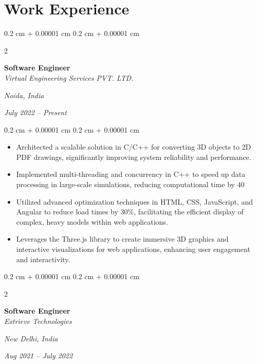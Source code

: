 \documentclass[10pt, letterpaper]{article}
\newenvironment{highlights}{
    \begin{itemize}[
        topsep=0.10 cm,
        parsep=0.10 cm,
        partopsep=0pt,
        itemsep=0pt,
        leftmargin=0.4 cm + 10pt
    ]
}{
    \end{itemize}
} %
\newenvironment{onecolentry}{
    \begin{adjustwidth}{
        0.2 cm + 0.00001 cm
    }{
        0.2 cm + 0.00001 cm
    }
}{
    \end{adjustwidth}
} %
\newenvironment{twocolentry}[2][]{
    \onecolentry
    \def\secondColumn{#2}
    \setcolumnwidth{\fill, 4.5 cm}
    \begin{paracol}{2}
}{
    \switchcolumn \raggedleft \secondColumn
    \end{paracol}
    \endonecolentry
} %
\begin{document}
    \section{Work Experience}

    \vspace{0.2 cm}

        \begin{twocolentry}{
        \textit{Noida, India}    

        \textit{July 2022 – Present}}
            \textbf{Software Engineer} \\
            \textit{Virtual Engineering Services PVT. LTD.}
        \end{twocolentry}

    \vspace{0.10 cm}
        \begin{onecolentry}
            \begin{highlights}
                \item Architected a scalable solution in C/C++ for converting 3D objects to 2D PDF drawings, significantly improving system reliability and performance.
                \item Implemented multi-threading and concurrency in C++ to speed up data processing in large-scale simulations, reducing computational time by 40%
                \item Utilized advanced optimization techniques in HTML, CSS, JavaScript, and Angular to reduce load times by 30\%, facilitating the efficient display of complex, heavy models within web applications.
                \item Leverages the Three.js library to create immersive 3D graphics and interactive visualizations for web applications, enhancing user engagement and interactivity.
            \end{highlights}
        \end{onecolentry}

        \begin{twocolentry}{
        \textit{New Delhi, India}    
            
        \textit{Aug 2021 – July 2022}}
            \textbf{Software Engineer} \\
            \textit{Extrieve Technologies}
        \end{twocolentry}
\end{document}
